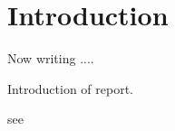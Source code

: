 \chapter{Introduction}

Now writing ....

Introduction of report.

see \cite{DBLP:journals/corr/KueflerMWK17}\cite{DBLP:journals/corr/DuanCHSA16}